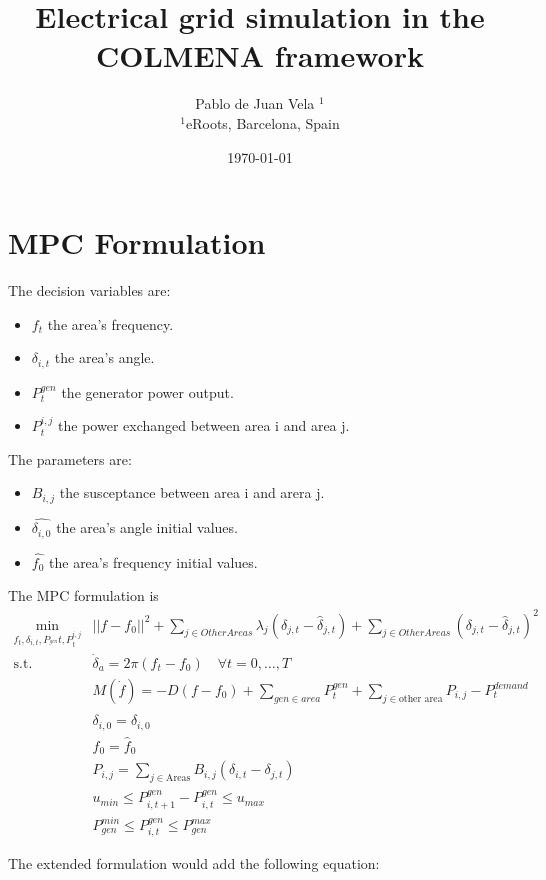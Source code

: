 \documentclass{article}
\title{Electrical grid simulation in the COLMENA framework}
\author{Pablo de Juan Vela $^{1}$ \\
        \small $^{1}$eRoots, Barcelona, Spain \\
}
\date{\today}
\begin{document}
\maketitle

\section{MPC Formulation}
The decision variables are:
\begin{itemize}
    \item $f_t$ the area's frequency.
    \item $\delta_{i,t}$ the area's angle.
    \item $P^{gen}_t$ the generator power output.
    \item $P^{i,j}_t$ the power exchanged between area i and area j.
\end{itemize}

The parameters are:
\begin{itemize}
    \item $B_{i,j}$ the susceptance between area i and arera j.
    \item $\hat{\delta_{i,0}}$ the area's angle initial values.
    \item $\hat{f_{0}}$ the area's frequency initial values.
\end{itemize}

The MPC formulation is
\begin{align}
    \min_{f_{t}, \delta_{i,t}, P_^{gen}{t}, P^{i,j}_t} &||f - f_0||^2 + \sum_{j \in OtherAreas} \lambda_j(\delta_{j,t} - \hat{\delta}_{j,t}) + \sum_{j \in OtherAreas}(\delta_{j,t} - \hat{\delta}_{j,t})^2\\
    \text{s.t.} \quad  &\dot{\delta}_a = 2 \pi (f_t - f_0) \quad  \forall t = 0, \dots, T\\
    & M(\dot{f})= -D(f-f_0) + \sum_{gen \in area} P^{gen}_t +\sum_{j \in \text{other area}}P_{i,j} - P^{demand}_t \\
    & \delta_{i,0} = \hat{\delta}_{i,0} \\
    & f_0 = \hat{f}_0 \\
    & P_{i,j} = \sum_{j \in \text{Areas}} B_{i,j}(\delta_{i,t} - \delta_{j,t}) \\
    & u_{min} \leq P^{gen}_{i, t+1} - P^{gen}_{i, t} \leq u_{max} \\
    & P_{gen}^{min} \leq P^{gen}_{i, t} \leq P_{gen}^{max}
\end{align}

The extended formulation would add the following equation:
\end{document}
